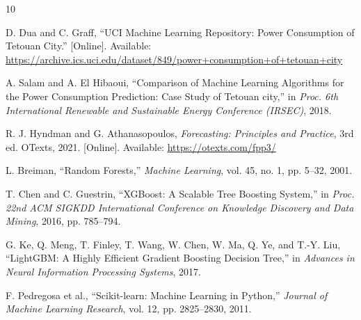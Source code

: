 
\begin{thebibliography}{10}

 D. Dua and C. Graff, ``UCI Machine Learning Repository:
Power Consumption of Tetouan City.'' [Online]. Available:
\url{https://archive.ics.uci.edu/dataset/849/power+consumption+of+tetouan+city}

 A. Salam and A. El Hibaoui, ``Comparison of Machine
Learning Algorithms for the Power Consumption Prediction: Case Study of
Tetouan city,'' in \emph{Proc. 6th International Renewable and Sustainable
Energy Conference (IRSEC)}, 2018.

 R. J. Hyndman and G. Athanasopoulos, \emph{Forecasting:
Principles and Practice}, 3rd ed. OTexts, 2021. [Online]. Available:
\url{https://otexts.com/fpp3/}

 L. Breiman, ``Random Forests,'' \emph{Machine Learning},
vol. 45, no. 1, pp. 5--32, 2001.

 T. Chen and C. Guestrin, ``XGBoost: A Scalable Tree
Boosting System,'' in \emph{Proc. 22nd ACM SIGKDD International Conference
on Knowledge Discovery and Data Mining}, 2016, pp. 785--794.

 G. Ke, Q. Meng, T. Finley, T. Wang, W. Chen, W. Ma, Q. Ye,
and T.-Y. Liu, ``LightGBM: A Highly Efficient Gradient Boosting Decision
Tree,'' in \emph{Advances in Neural Information Processing Systems}, 2017.

 F. Pedregosa et al., ``Scikit-learn: Machine Learning in
Python,'' \emph{Journal of Machine Learning Research}, vol. 12,
pp. 2825--2830, 2011.

\end{thebibliography}
